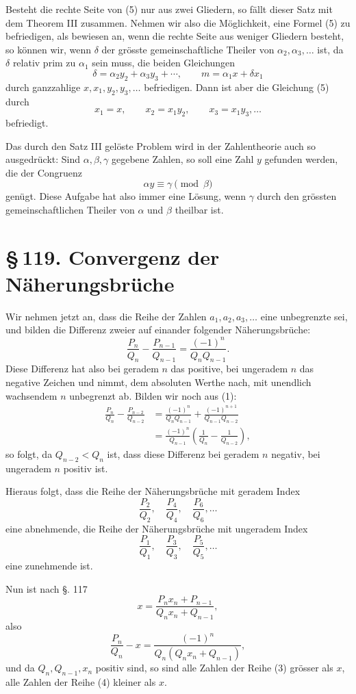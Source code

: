 \documentclass[11pt]{article}
\providecommand{\sect}[2]{\section*{\S\,#1. #2}}
\begin{document}
Besteht die rechte Seite von (5) nur aus zwei Gliedern, so fällt dieser Satz mit dem Theorem III zusammen. Nehmen wir also die Möglichkeit, eine Formel (5) zu befriedigen, als bewiesen an, wenn die rechte Seite aus weniger Gliedern besteht, so können wir, wenn $\delta$ der grösste gemeinschaftliche Theiler von $\alpha_2,\alpha_3,\ldots$ ist, da $\delta$ relativ prim zu $\alpha_1$ sein muss, die beiden Gleichungen
\[
        \delta=\alpha_2y_2+\alpha_3y_3+\cdots,
        \qquad
        m=\alpha_1x+\delta x_1
\]
durch ganzzahlige $x,x_1,y_2,y_3,\ldots$ befriedigen. Dann ist aber die Gleichung (5) durch
\[
        x_1=x,
        \qquad
        x_2=x_1y_2,
        \qquad
        x_3=x_1y_3,
        \ldots
\]
befriedigt.

Das durch den Satz III gelöste Problem wird in der Zahlentheorie auch so ausgedrückt: Sind $\alpha,\beta,\gamma$ gegebene Zahlen, so soll eine Zahl $y$ gefunden werden, die der Congruenz
\[
        \alpha y\equiv \gamma \pmod{\beta}
\]
genügt. Diese Aufgabe hat also immer eine Lösung, wenn $\gamma$ durch den grössten gemeinschaftlichen Theiler von $\alpha$ und $\beta$ theilbar ist.

\sect{119}{Convergenz der Näherungsbrüche}

Wir nehmen jetzt an, dass die Reihe der Zahlen $a_1,a_2,a_3,\ldots$ eine unbegrenzte sei, und bilden die Differenz zweier auf einander folgender Näherungsbrüche:
\[
\tag{1}        \frac{P_n}{Q_n}-\frac{P_{n-1}}{Q_{n-1}}
        =\frac{(-1)^n}{Q_nQ_{n-1}}.
\]
Diese Differenz hat also bei geradem $n$ das positive, bei ungeradem $n$ das negative Zeichen und nimmt, dem absoluten Werthe nach, mit unendlich wachsendem $n$ unbegrenzt ab. Bilden wir noch aus (1):
\[
\tag{2}
\begin{aligned}
\frac{P_n}{Q_n}-\frac{P_{n-2}}{Q_{n-2}}
&=\frac{(-1)^n}{Q_nQ_{n-1}}+\frac{(-1)^{n+1}}{Q_{n-1}Q_{n-2}}  \\
&=\frac{(-1)^n}{Q_{n-1}}\left(\frac1{Q_n}-\frac1{Q_{n-2}}\right),
\end{aligned}
\]
so folgt, da $Q_{n-2}<Q_n$ ist, dass diese Differenz bei geradem $n$ negativ, bei ungeradem $n$ positiv ist.

Hieraus folgt, dass die Reihe der Näherungsbrüche mit geradem Index
\[
\tag{3}        \frac{P_2}{Q_2},\quad \frac{P_4}{Q_4},\quad \frac{P_6}{Q_6},\ldots
\]
eine abnehmende, die Reihe der Näherungsbrüche mit ungeradem Index
\[
\tag{4}        \frac{P_1}{Q_1},\quad \frac{P_3}{Q_3},\quad \frac{P_5}{Q_5},\ldots
\]
eine zunehmende ist.

Nun ist nach §. 117
\[
        x=\frac{P_nx_n+P_{n-1}}{Q_nx_n+Q_{n-1}},
\]
also
\[
\tag{5}        \frac{P_n}{Q_n}-x
        =\frac{(-1)^n}{Q_n(Q_nx_n+Q_{n-1})},
\]
und da $Q_n,Q_{n-1},x_n$ positiv sind, so sind alle Zahlen der Reihe (3) grösser als $x$, alle Zahlen der Reihe (4) kleiner als $x$.
\end{document}

